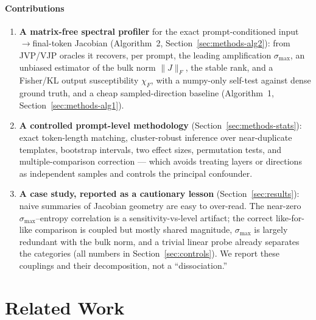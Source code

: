 \documentclass{article}
\begin{document}
\paragraph{Contributions}
\begin{enumerate}\setlength{\itemsep}{2pt}
  \item \textbf{A matrix-free spectral profiler} for the exact prompt-conditioned
  input$\to$final-token Jacobian (Algorithm~2, Section~\ref{sec:methods-alg2}): from JVP/VJP oracles
  it recovers, per prompt, the leading amplification $\sigma_{\max}$, an unbiased estimator of the
  bulk norm $\|J\|_F$, the stable rank, and a Fisher/KL output susceptibility $\chi_F$, with a
  numpy-only self-test against dense ground truth, and a cheap sampled-direction baseline
  (Algorithm~1, Section~\ref{sec:methods-alg1}).
  \item \textbf{A controlled prompt-level methodology} (Section~\ref{sec:methods-stats}): exact
  token-length matching, cluster-robust inference over near-duplicate templates, bootstrap intervals,
  two effect sizes, permutation tests, and multiple-comparison correction --- which avoids treating
  layers or directions as independent samples and controls the principal confounder.
  \item \textbf{A case study, reported as a cautionary lesson} (Section~\ref{sec:results}): naive
  summaries of Jacobian geometry are easy to over-read. The near-zero $\sigma_{\max}$--entropy
  correlation is a sensitivity-vs-level artifact; the correct like-for-like comparison is coupled but
  mostly shared magnitude, $\sigma_{\max}$ is largely redundant with the bulk norm, and a trivial
  linear probe already separates the categories (all numbers in Section~\ref{sec:controls}). We report
  these couplings and their decomposition, not a ``dissociation.''
\end{enumerate}

\section{Related Work}
\label{sec:related}
\end{document}
